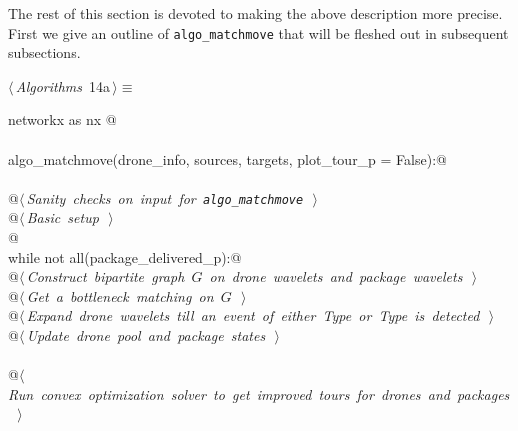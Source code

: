 \documentclass[10pt, english, oneside]{report}
\begin{document}
The rest of this section is devoted to making the above description 
more precise. First we give an outline of  \verb|algo_matchmove| that will be 
fleshed out in subsequent subsections. 

\begin{flushleft} \small
\begin{minipage}{\linewidth}\label{scrap13}\raggedright\small
{} $\langle\,${\itshape Algorithms}\nobreak\ {\footnotesize {14a}}$\,\rangle\equiv$
\vspace{-1ex}
\begin{list}{}{} \item
\mbox{}\verb@import networkx as nx @\\
\mbox{}\verb@@\\
\mbox{}\verb@def algo_matchmove(drone_info, sources, targets, plot_tour_p = False):@\\
\mbox{}\verb@@\\
\mbox{}\verb@     @\hbox{$\langle\,${\itshape Sanity checks on input for \verb|algo_matchmove|}\nobreak\ {\footnotesize {}}$\,\rangle$}\verb@@\\
\mbox{}\verb@     @\hbox{$\langle\,${\itshape Basic setup}\nobreak\ {\footnotesize {}}$\,\rangle$}\verb@@\\
\mbox{}\verb@    @\\
\mbox{}\verb@     while not all(package_delivered_p):@\\
\mbox{}\verb@          @\hbox{$\langle\,${\itshape Construct bipartite graph $G$ on drone wavelets and package wavelets}\nobreak\ {\footnotesize {}}$\,\rangle$}\verb@@\\
\mbox{}\verb@          @\hbox{$\langle\,${\itshape Get a bottleneck matching on $G$}\nobreak\ {\footnotesize {}}$\,\rangle$}\verb@@\\
\mbox{}\verb@          @\hbox{$\langle\,${\itshape Expand drone wavelets till an event of either Type  or Type  is detected}\nobreak\ {\footnotesize {}}$\,\rangle$}\verb@@\\
\mbox{}\verb@          @\hbox{$\langle\,${\itshape Update drone pool and package states}\nobreak\ {\footnotesize {}}$\,\rangle$}\verb@@\\
\mbox{}\verb@@\\
\mbox{}\verb@     @\hbox{$\langle\,${\itshape Run convex optimization solver to get improved tours for drones and packages}\nobreak\ {\footnotesize {}}$\,\rangle$}\verb@@\\

\end{list}
\end{minipage}
\end{flushleft}
\end{document}
